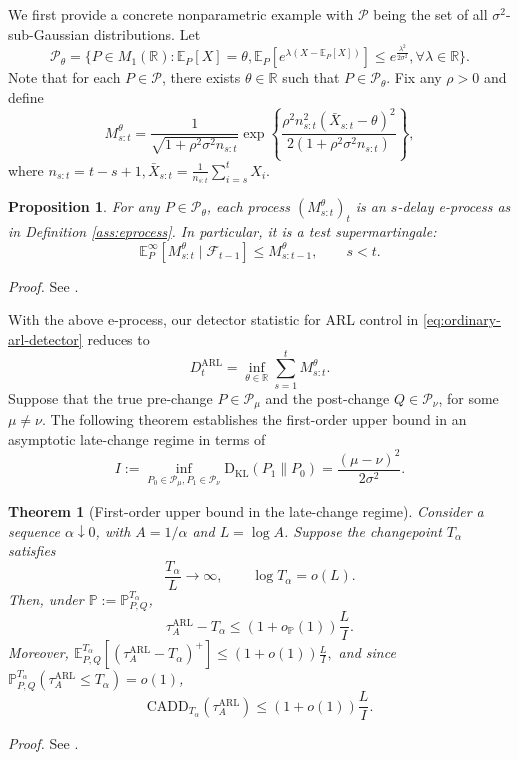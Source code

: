 \documentclass[12pt]{article}
\theoremstyle{spaced}
\newtheorem{theorem}{Theorem}[section]
\newtheorem{proposition}[proposition]{Proposition}
\theoremstyle{remark}
\newcommand{\E}{\mathbb E}
\newcommand{\R}{\mathbb R}
\newcommand{\calP}{\mathcal P}
\newcommand{\calF}{\mathcal F}
\newcommand{\bbP}{\mathbb P}
\newcommand{\KL}{\mathrm{D}_{\text{KL}}}
\newcommand{\CADD}{\mathrm{CADD}}
\begin{document}
We first provide a concrete nonparametric example with $\calP$ being the set of all $\sigma^2$-sub-Gaussian distributions.
Let $$\mathcal{P}_\theta = \{ P \in M_1(\mathbb{R}) : \mathbb{E}_P[X]=\theta,\mathbb{E}_P[e^{\lambda(X-\mathbb{E}_P[X])}] \leq e^{\frac{\lambda^2}{2\sigma^2}} , \forall \lambda \in \mathbb{R} \}.$$ 
Note that for each $P\in\calP$, there exists $\theta\in\mathbb R$ such that $P\in\calP_\theta$.
Fix any $\rho>0$ and define
\begin{equation}
\label{eq:mixture-evalue}
  M_{s:t}^{\theta}
  =
  \frac{1}{\sqrt{1+\rho^2\sigma^2 n_{s:t}}}
  \exp\left\{
    \frac{\rho^2 n_{s:t}^2(\bar X_{s:t}-\theta)^2}
         {2(1+\rho^2\sigma^2 n_{s:t})}
  \right\},
\end{equation}
where $n_{s:t}=t-s+1,
  \bar X_{s:t}=\frac{1}{n_{s:t}}\sum_{i=s}^t X_i.$
\begin{proposition}
\label{prop:gaussian-mixture}
 For any $P\in\calP_\theta$, each process $(M_{s:t}^{\theta})_{t}$ is an $s$-delay e-process as in Definition \ref{ass:eprocess}.  In particular, it is a test supermartingale:
\[
  \E_P^\infty[M_{s:t}^{\theta}\mid \calF_{t-1}]
  \le M_{s:t-1}^{\theta},\qquad s<t.
\]
\end{proposition}
\emph{Proof.} See .

With the above e-process, our detector statistic for ARL control in \eqref{eq:ordinary-arl-detector} reduces to
\begin{equation}
\label{eq:D-def}
D_t^{\mathrm{ARL}}=\inf_{\theta\in\R}\sum_{s=1}^t M_{s:t}^{\theta}.
\end{equation}
Suppose that the true pre-change $P\in\mathcal{P}_\mu$ and the post-change $Q\in\mathcal{P}_\nu$, for some $\mu\neq\nu$.
The following theorem establishes the first-order upper bound in an asymptotic late-change regime in terms of 
\begin{equation}
\label{eq:subg-information}
I:=\inf_{P_0\in \mathcal{P}_\mu,P_1\in \mathcal{P}_\nu}\KL(P_1\|P_0)=\frac{(\mu-\nu)^2}{2\sigma^2}.
\end{equation}

\begin{theorem}[First-order upper bound in the late-change regime]
\label{thm:upper-bdd-sub-Gaussian}
Consider a sequence $\alpha\downarrow 0$, with $A=1/\alpha$ and $L=\log A$.  Suppose the changepoint $T_\alpha$ satisfies
\begin{equation}
\label{eq:late-change-assumption}
  \frac{T_\alpha}{L}\to\infty,
  \qquad
  \log T_\alpha=o(L).
\end{equation}
Then, under $\bbP:=\bbP^{T_\alpha}_{P,Q}$,
\begin{equation}
   \tau_A^{\mathrm{ARL}}-T_\alpha
    \le
    (1+o_\bbP(1))\frac{L}{I}.
\end{equation}
Moreover,
$\E^{T_\alpha}_{P,Q}[(\tau_A^{\mathrm{ARL}}-T_\alpha)^+]
  \le
  (1+o(1))\frac{L}{I},$
and since $\bbP^{T_\alpha}_{P,Q}(\tau_A^{\mathrm{ARL}}\le T_\alpha)=o(1)$,
\[
  \CADD_{T_\alpha}(\tau_A^{\mathrm{ARL}})
  \le
  (1+o(1))\frac{L}{I}.
\]
\end{theorem}
\emph{Proof.} See .
\end{document}
